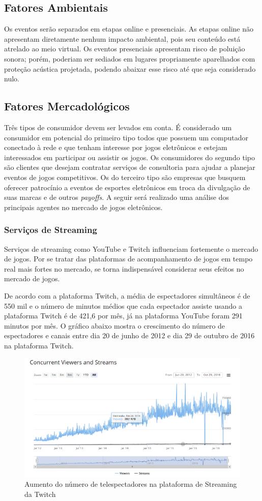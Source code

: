 \documentclass[a4paper, 12pt]{paper}
\begin{document}
\subsection{Fatores Ambientais}
Os eventos serão separados em etapas online e presenciais. As etapas online não apresentam diretamente nenhum impacto ambiental, pois seu conteúdo está atrelado ao meio virtual. Os eventos presenciais apresentam risco de poluição sonora; porém, poderiam ser sediados em lugares propriamente aparelhados com proteção acústica projetada, podendo abaixar esse risco até que seja considerado nulo.
\subsection{Fatores Mercadológicos}
Três tipos de consumidor devem ser levados em conta. É considerado um consumidor em potencial do primeiro tipo todos que possuem um computador conectado à rede e que tenham interesse por jogos eletrônicos e estejam interessados em participar ou assistir os jogos. Os consumidores do segundo tipo são clientes que desejam contratar serviços de consultoria para ajudar a planejar eventos de jogos competitivos. Os do terceiro tipo são empresas que busquem oferecer patrocínio a eventos de esportes eletrônicos em troca da divulga\c{c}\~{a}o de suas marcas e de outros \textit{payoffs}. A seguir será realizado uma análise dos principais agentes no mercado de jogos eletrônicos.
\subsubsection{Serviços de Streaming}
Serviços de streaming como YouTube e Twitch influenciam fortemente o mercado de jogos. Por se tratar das plataformas de acompanhamento de jogos em tempo real mais fortes no mercado, se torna indispensável considerar seus efeitos no mercado de jogos.

De acordo com a plataforma Twitch, a média de espectadores simultâneos é de 550 mil e o número de minutos médios que cada espectador assiste usando a plataforma Twitch é de 421,6 por mês, já na plataforma YouTube foram 291 minutos por mês. O gráfico abaixo mostra o crescimento do número de espectadores e canais entre dia 20 de junho de 2012 e dia 29 de outubro de 2016 na plataforma Twitch.
\begin{figure}[!ht]
	\centering
	\includegraphics[scale=0.62]{img/img03.png}
	\caption{Aumento do número de telespectadores na plataforma de Streaming da Twitch}
\end{figure}
\end{document}
